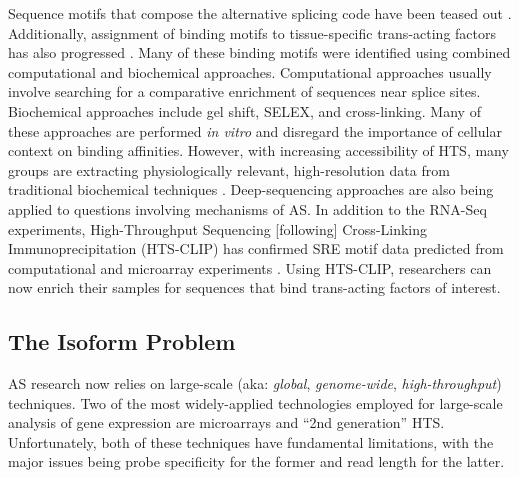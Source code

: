     Sequence motifs that compose the alternative splicing code have been teased out \citep{Ladd2002, Barash2010}. Additionally, assignment of binding motifs to tissue-specific trans-acting factors has also progressed \citep{Jin2003,Ule2005,Licatalosi2008}. Many of these binding motifs were identified using combined computational and biochemical approaches. Computational approaches usually involve searching for a comparative enrichment of sequences near splice sites. Biochemical approaches include gel shift, SELEX, and cross-linking. Many of these approaches are performed \textit{in vitro} and disregard the importance of cellular context on binding affinities. However, with increasing accessibility of HTS, many groups are extracting physiologically relevant, high-resolution data from traditional biochemical techniques \citep{Ingolia2009, Ingolia2011}. Deep-sequencing approaches are also being applied to questions involving mechanisms of AS. In addition to the RNA-Seq experiments, High-Throughput Sequencing [following] Cross-Linking Immunoprecipitation (HTS-CLIP) has confirmed SRE motif data predicted from computational and microarray experiments \citep{Licatalosi2008,Hafner2010}. Using HTS-CLIP, researchers can now enrich their samples for sequences that bind trans-acting factors of interest. 

  \subsection{The Isoform Problem}\label{Intro:sec:Isoform Problem}

    AS research now relies on large-scale (aka: \textit{global}, \textit{genome-wide}, \textit{high-throughput}) techniques. Two of the most widely-applied technologies employed for large-scale analysis of gene expression are microarrays and ``2nd generation'' HTS. Unfortunately, both of these techniques have fundamental limitations, with the major issues being probe specificity for the former and read length for the latter.

